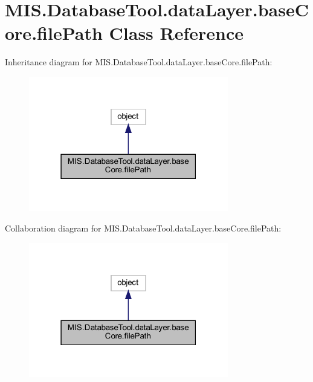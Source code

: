 \hypertarget{classMIS_1_1DatabaseTool_1_1dataLayer_1_1baseCore_1_1filePath}{}\section{M\+I\+S.\+Database\+Tool.\+data\+Layer.\+base\+Core.\+file\+Path Class Reference}
\label{classMIS_1_1DatabaseTool_1_1dataLayer_1_1baseCore_1_1filePath}


Inheritance diagram for M\+I\+S.\+Database\+Tool.\+data\+Layer.\+base\+Core.\+file\+Path\+:\nopagebreak
\begin{figure}[H]
\begin{center}
\leavevmode
\includegraphics[width=247pt]{classMIS_1_1DatabaseTool_1_1dataLayer_1_1baseCore_1_1filePath__inherit__graph}
\end{center}
\end{figure}


Collaboration diagram for M\+I\+S.\+Database\+Tool.\+data\+Layer.\+base\+Core.\+file\+Path\+:\nopagebreak
\begin{figure}[H]
\begin{center}
\leavevmode
\includegraphics[width=247pt]{classMIS_1_1DatabaseTool_1_1dataLayer_1_1baseCore_1_1filePath__coll__graph}
\end{center}
\end{figure}
